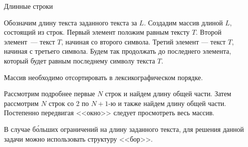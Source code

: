 \begin{tutorial}{Длинные строки}

Обозначим длину текста заданного текста за $L$. Создадим массив длиной $L$, состоящий из строк. Первый элемент положим равным тексту $T$. Второй элемент~--- текст $T$, начиная со второго символа. Третий элемент --- текст $T$, начиная с третьего символа. Будем так продолжать до последнего элемента, который будет равным последнему символу текста $T$.

Массив необходимо отсортировать в лексикографическом порядке.

Рассмотрим подробнее первые $N$ строк и найдем длину общей части. Затем рассмотрим $N$ строк со 2 по $N+1$-ю и также найдем длину общей части. Постепенно передвигая <<окно>> следует просмотреть весь массив.

В случае б\'{о}льших ограничений на длину заданного текста, для решения данной задачи можно использовать структуру <<бор>>.

\end{tutorial}

